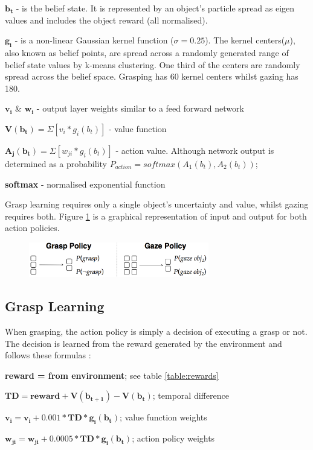 \documentclass[11]{article}
\begin{document}
\begin{list}{}{}
 \item $\pmb{b_t}$ - is the belief state. It is represented by an object's particle spread as eigen values and includes the object reward (all normalised).
 \item $\pmb{g_i}$ - is a non-linear Gaussian kernel function ($\sigma=0.25$).  The kernel centers($\mu$), also known as belief points, are spread across a randomly generated range of belief state values by k-means clustering. One third of the centers are randomly spread across the belief space.
Grasping has 60 kernel centers whilst gazing has 180.
 \item $\pmb{v_i}$ \& $\pmb{w_i}$ - output layer weights similar to a feed forward network
 \item $\pmb{V(b_t)}= \Sigma[v_i * g_i(b_t)]$ - value function
 \item $\pmb{A_j(b_t)}= \Sigma[w_{ji} * g_i(b_t)]$ - action value. Although network output is determined as a probability $P_{action} = softmax(A_1(b_t),A_2(b_t))$; 
 \item \textbf{softmax} - normalised exponential function
\end{list}

Grasp learning requires only a single object's uncertainty and value, whilst gazing  requires both. Figure \ref{fig:inout} is a graphical representation of input and output for both action policies.

\begin{figure}[h]
	\centering
	\includegraphics[width=0.7\textwidth]{inputoutput.png}
	\caption{}
	\label{fig:inout}
\end{figure}

\subsection{Grasp Learning}
When grasping, the action policy is simply a decision of executing a grasp or not. The decision is learned from the reward generated by the environment and follows these formulas : 
\begin{list}{}{}
  \item \textbf{reward =  from environment}; see table \ref{table:rewards}
  \item $\pmb{TD = reward + V(b_{t+1}) - V(b_t)}$; temporal difference
  \item $\pmb{ v_i = v_i + 0.001 * TD * g_i(b_t)}$; value function weights
  \item $\pmb{w_{ji} = w_{ji}+ 0.0005 * TD * g_i(b_t)}$; action policy weights
\end{list}  
\end{document}
